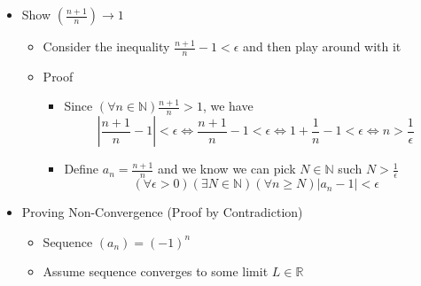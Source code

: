 \documentclass{article}
\begin{document}
\begin{itemize}
\begin{itemize}
        \item Start playing around with the definition by choosing $\epsilon = 0.1$
        \item How large does $N$ have to be so that $\left\vert \frac{1}{\sqrt{N}} - 0 \right\vert < 0.1$
        \item $N=100$ is not quite large enough, but $N=101$ is large enough
        \item Proof
        \begin{itemize}
            \item In general, for every $\epsilon > 0$, we can pick $N > \frac{1}{\epsilon^2}$ (because the natural numbers are unbounded), and so $\frac{1}{\sqrt{N}} < \epsilon$ and $(\forall n \ge N) \frac{1}{\sqrt{n}} < \epsilon$
            \item $(\forall \epsilon > 0)(\exists N \in \mathbb{N})(\forall n \ge N) \left\vert \frac{1}{\sqrt{n}} - 0 \right\vert < \epsilon$
        \end{itemize}
    \end{itemize}
    \item Show $\left( \frac{n+1}{n} \right) \rightarrow 1$
    \begin{itemize}
        \item Consider the inequality $\frac{n+1}{n} -1 < \epsilon$ and then play around with it
        \item Proof
        \begin{itemize}
            \item Since $(\forall n \in \mathbb{N}) \frac{n+1}{n} > 1$, we have
            \[
            \left\vert \frac{n+1}{n} - 1 \right\vert < \epsilon \Longleftrightarrow \frac{n+1}{n} - 1 < \epsilon \Longleftrightarrow 1 + \frac{1}{n} - 1 < \epsilon \Longleftrightarrow n > \frac{1}{\epsilon}
            \]
            \item Define $a_n = \frac{n+1}{n}$ and we know we can pick $N \in \mathbb{N}$ such $N > \frac{1}{\epsilon}$
            \[ (\forall \epsilon > 0)(\exists N \in \mathbb{N})(\forall n \ge N) \vert a_n -1 \vert < \epsilon \]
        \end{itemize}
    \end{itemize}
    \item Proving Non-Convergence (Proof by Contradiction)
    \begin{itemize}
        \item Sequence $(a_n)=(-1)^n$
        \item Assume sequence converges to some limit $L \in \mathbb{R}$

\end{itemize}
\end{itemize}
\end{document}
